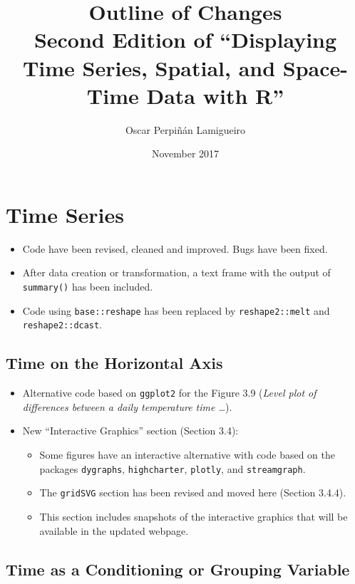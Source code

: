 \documentclass[11pt]{article}
\author{Oscar Perpiñán Lamigueiro}
\date{November 2017}
\title{Outline of Changes\\\medskip
\large Second Edition of ``Displaying Time Series, Spatial, and Space-Time Data with R''}
\begin{document}
\maketitle


\section*{Time Series}
\label{sec:orgbb04cc8}

\begin{itemize}
\item Code have been revised, cleaned and improved. Bugs have been fixed.

\item After data creation or transformation, a text frame with the output of \texttt{summary()} has been included.

\item Code using \texttt{base::reshape} has been replaced by \texttt{reshape2::melt} and \texttt{reshape2::dcast}.
\end{itemize}

\subsection*{Time on the Horizontal Axis}
\label{sec:orgc386f10}

\begin{itemize}
\item Alternative code based on \texttt{ggplot2} for the Figure 3.9 (\emph{Level plot of differences between a daily temperature time \ldots{}}).

\item New ``Interactive Graphics'' section (Section 3.4):
\begin{itemize}
\item Some figures have an interactive alternative with code based on the packages \texttt{dygraphs}, \texttt{highcharter}, \texttt{plotly}, and \texttt{streamgraph}.
\item The \texttt{gridSVG} section has been revised and moved here (Section 3.4.4).
\item This section includes snapshots of the interactive graphics that will be available in the updated webpage.
\end{itemize}
\end{itemize}

\subsection*{Time as a Conditioning or Grouping Variable}
\label{sec:orgf3b4bac}
\end{document}

